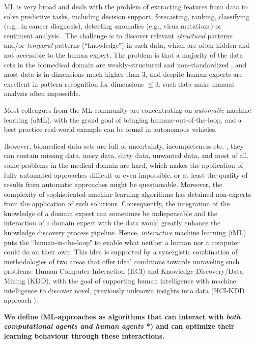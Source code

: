 ML is very broad and deals with the problem of extracting features from data to solve predictive tasks, including decision support, forecasting, ranking, classifying (e.g., in cancer diagnosis), detecting anomalies (e.g., virus mutations) or sentiment analysis \cite{PetzEtAl:2015:Sentiment}. 
The challenge is to discover relevant \emph{structural} patterns and/or \emph{temporal} patterns (``knowledge") in such data, which are often hidden and not accessible to the human expert. The problem is that a majority of the data sets in the biomedical domain are weakly-structured and non-standardized \cite{HolzingerEtAl:2014:KDDBio}, and most data is in dimensions much higher than $3$, and despite human experts are excellent in pattern recognition for dimensions $\leq 3$, such data make manual analysis often impossible.

Most colleagues from the ML community are concentrating on \textit{automatic} machine learning (aML), with the grand goal of bringing humans-out-of-the-loop, and a best practice real-world example can be found in autonomous vehicles.

However, biomedical data sets are full of uncertainty, incompleteness etc. \cite{Holzinger:2014:SpringerTextbook}, they can contain missing data, noisy data, dirty data, unwanted data, and most of all, some problems in the medical domain are hard, which makes the application of fully automated approaches difficult or even impossible, or at least the quality of results from automatic approaches might be questionable. Moreover, the complexity of sophisticated machine learning algorithms has detained non-experts from the application of such solutions.
Consequently, the integration of the knowledge of a domain expert can sometimes be indispensable and the interaction of a domain expert with the data would greatly enhance the knowledge discovery process pipeline.
Hence, \textit{interactive} machine learning (iML) puts the ``human-in-the-loop" to enable what neither a human nor a computer could do on their own. This idea is supported by a synergistic combination of methodologies of two areas that offer ideal conditions towards unraveling such problems: Human-Computer Interaction (HCI) and Knowledge Discovery/Data Mining (KDD), with the goal of supporting human intelligence with machine intelligence to discover novel, previously unknown insights into data (HCI-KDD approach \cite{Holzinger:2013:HCI-KDD}).

\textbf{We define iML-approaches as algorithms that can interact with \textit{both computational agents and human agents} *) and can optimize their learning behaviour through these interactions.}

